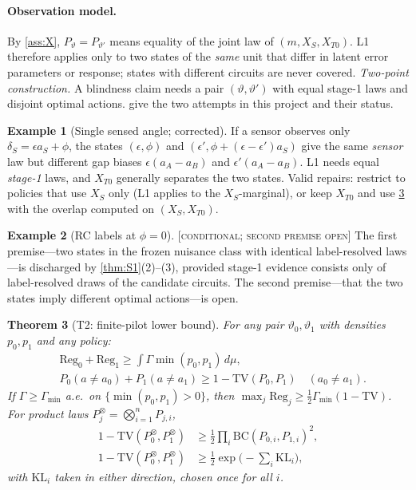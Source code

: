 \documentclass[10pt,twocolumn]{article}
\newtheorem{theorem}{Theorem}
\theoremstyle{definition}
\newtheorem{example}[theorem]{Example}
\theoremstyle{remark}
\newcommand{\status}[1]{\hfill{\footnotesize\upshape\textsc{[#1]}}}
\newcommand{\eps}{\epsilon}
\newcommand{\vt}{\vartheta}
\newcommand{\TV}{\mathrm{TV}}
\newcommand{\KL}{\mathrm{KL}}
\newcommand{\BC}{\mathrm{BC}}
\newcommand{\Reg}{\mathrm{Reg}}
\begin{document}
\paragraph{Observation model.} By \cref{ass:X}, $P_\vt=P_{\vt'}$ means equality of the joint law of $(m,X_S,X_{T0})$. L1 therefore applies only to two states of the \emph{same} unit that differ in latent error parameters or response; states with different circuits are never covered. \emph{Two-point construction.} A blindness claim needs a pair $(\vt,\vt')$ with equal stage-1 laws and disjoint optimal actions.  give the two attempts in this project and their status.

\begin{example}[Single sensed angle; corrected]\label{ex:E1}
If a sensor observes only $\delta_S=\eps a_S+\phi$, the states $(\eps,\phi)$ and $(\eps',\phi+(\eps-\eps')a_S)$ give the same \emph{sensor} law but different gap biases $\eps(a_A-a_B)$ and $\eps'(a_A-a_B)$. L1 needs equal \emph{stage-1} laws, and $X_{T0}$ generally separates the two states. Valid repairs: restrict to policies that use $X_S$ only (L1 applies to the $X_S$-marginal), or keep $X_{T0}$ and use \cref{thm:T2} with the overlap computed on $(X_S,X_{T0})$.
\end{example}

\begin{example}[RC labels at $\phi=0$]\label{ex:E2}\status{conditional; second premise open}
The first premise---two states in the frozen nuisance class with identical label-resolved laws---is discharged by \cref{thm:S1}(2)--(3), provided stage-1 evidence consists only of label-resolved draws of the candidate circuits. The second premise---that the two states imply different optimal actions---is open.
\end{example}

\begin{theorem}[T2: finite-pilot lower bound]\label{thm:T2}
For any pair $\vt_0,\vt_1$ with densities $p_0,p_1$ and any policy:
\begin{align}
&\Reg_0+\Reg_1\ge\textstyle\int\Gamma\min(p_0,p_1)\,d\mu,\label{eq:T2a}\\
&P_0(a\neq a_0)+P_1(a\neq a_1)\ge1-\TV(P_0,P_1)\quad(a_0\neq a_1).\label{eq:T2c}
\end{align}
If $\Gamma\ge\Gamma_{\min}$ a.e.\ on $\{\min(p_0,p_1)>0\}$, then $\max_j\Reg_j\ge\tfrac12\Gamma_{\min}(1-\TV)$. For product laws $P_j^{\otimes}=\bigotimes_{i=1}^nP_{j,i}$,
\begin{align}
1-\TV(P_0^{\otimes},P_1^{\otimes})&\ge\tfrac12\textstyle\prod_i\BC(P_{0,i},P_{1,i})^2,\label{eq:T2e}\\
1-\TV(P_0^{\otimes},P_1^{\otimes})&\ge\tfrac12\exp\bigl(-\textstyle\sum_i\KL_i\bigr),\label{eq:T2d}
\end{align}
with $\KL_i$ taken in either direction, chosen once for all $i$.
\end{theorem}
\end{document}
